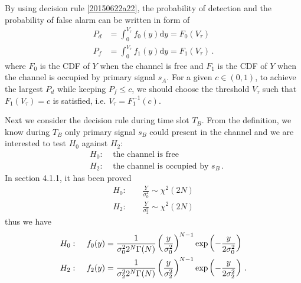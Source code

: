 By using decision rule \eqref{20150622a22}, the probability of detection and the probability of false alarm can be written in form of 
\begin{equation}
  \begin{split}
  P_d &= \int_{0}^{V_\tau} f_0(y) \mathrm{d}y = F_0(V_\tau)\\
  P_f &= \int_{0}^{V_\tau} f_1(y) \mathrm{d}y= F_1(V_\tau)\,.
    \end{split}
    \label{20150622a32}
  \end{equation}
  where $F_0$ is the CDF of $Y$ when the channel is free and $F_1$ is the CDF of $Y$ when the channel is occupied by primary signal $s_A$. For a given $c \in (0, 1)$, to achieve the largest  $P_d$ while keeping $P_f \leq c$, we should choose the threshold $V_\tau$ such that $F_1(V_\tau) = c$ is satisfied, i.e. $V_\tau = F^{-1}_1(c)$. 

Next we consider the decision rule during time slot $T_B$. From the definition, we know during $T_B$ only primary signal $s_B$ could present in the channel and we are interested to test $H_0$ against $H_2$:
\begin{equation}
  \begin{split}
&H_0:\;\;\;\;\text{the channel is free}\\
&H_2:\;\;\;\;\text{the channel is occupied by $s_B$}\,.
\end{split}
\end{equation}
In section 4.1.1, it has been proved 
\begin{equation}
\begin{split}
  H_0:\;\;\;\;&\frac{Y}{\sigma_0^2} \sim \chi^2(2N)\\
H_2:\;\;\;\;&\frac{Y}{\sigma_2^2} \sim \chi^2(2N)
\end{split}
\end{equation}
thus we have
\begin{equation}
  \begin{split}
    H_0:\;\;\;\;\;&f_0(y) = \CHISQUY[\sigma_0^2]\\
    H_2:\;\;\;\;\;&f_{2}(y) = \CHISQUY[\sigma_2^2]\,.
  \end{split}
\end{equation}

